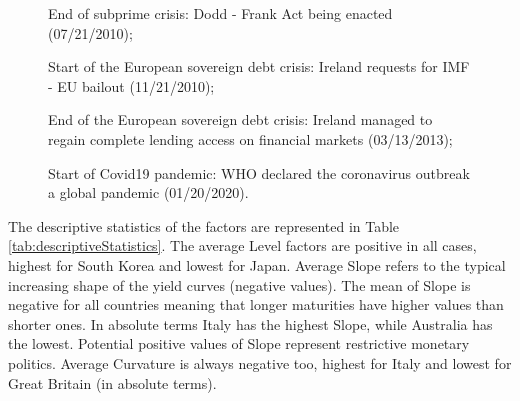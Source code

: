 \documentclass[12pt,bibliography=totoc]{article}
\begin{document}
\begin{figure}[H]
{End of subprime crisis: Dodd - Frank Act being enacted (07/21/2010);

\smallskip

Start of the European sovereign debt crisis: Ireland requests for IMF -  EU bailout (11/21/2010);

End of the European sovereign debt crisis: Ireland managed to regain complete lending access on financial markets (03/13/2013);

\smallskip

Start of Covid19 pandemic: WHO declared the coronavirus outbreak a global pandemic (01/20/2020). 
}

\end{figure}







The descriptive statistics of the factors are represented in Table \ref{tab:descriptiveStatistics}. The average Level factors are positive in all cases, highest for South Korea and lowest for Japan. Average Slope refers to the typical increasing shape of the yield curves (negative values). The mean of Slope is negative for all countries meaning that longer maturities have higher values than shorter ones. In absolute terms Italy has the highest Slope, while Australia has the lowest. Potential positive values of Slope represent restrictive monetary politics. Average Curvature is always negative too, highest for Italy and lowest for Great Britain (in absolute terms).
\end{document}
